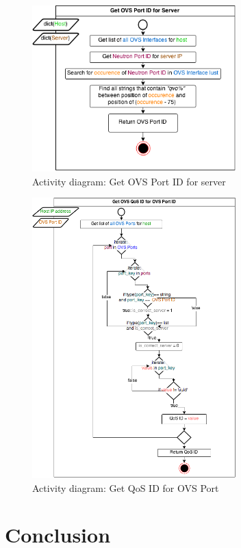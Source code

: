 \begin{figure}[H]
\centering

\includegraphics[width=0.7\textwidth]{images/design/activity_get_ovs_port_server}

\caption{Activity diagram: Get OVS Port ID for server}
\end{figure}

\begin{figure}[H]
\centering

\includegraphics[width=0.7\textwidth]{images/design/activity_get_qos_id_for_ovs_port}

\caption{Activity diagram: Get QoS ID for OVS Port}
\end{figure}





\section{Conclusion}